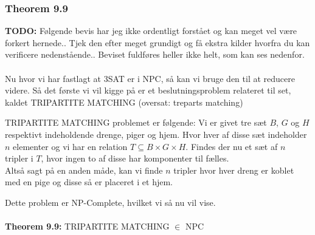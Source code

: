 \subsubsection{Theorem 9.9}

\textbf{TODO: } Følgende bevis har jeg ikke ordentligt forstået og kan meget vel være forkert hernede.. Tjek den efter meget grundigt og få ekstra kilder hvorfra du kan verificere nedenstående.. Beviset fuldføres heller ikke helt, som kan ses nedenfor. \\
~\\
Nu hvor vi har fastlagt at 3SAT er i NPC, så kan vi bruge den til at reducere videre. Så det første vi vil kigge på er et beslutningsproblem relateret til set, kaldet TRIPARTITE MATCHING (oversat: treparts matching)

TRIPARTITE MATCHING problemet er følgende: Vi er givet tre sæt $B$, $G$ og $H$ respektivt indeholdende drenge, piger og hjem. Hvor hver af disse sæt indeholder $n$ elementer og vi har en relation $T \subseteq B \times G \times H$. Findes der nu et sæt af $n$ tripler i $T$, hvor ingen to af disse har komponenter til fælles. \\

Altså sagt på en anden måde, kan vi finde $n$ tripler hvor hver dreng er koblet med en pige og disse så er placeret i et hjem.

Dette problem er NP-Complete, hvilket vi så nu vil vise.
\\
~\\
\textbf{Theorem 9.9:} TRIPARTITE MATCHING $\in$ NPC

